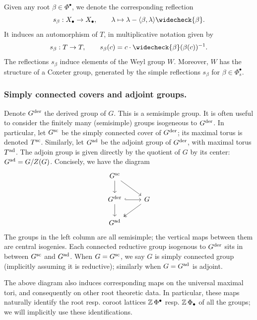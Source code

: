 Given any root $\beta \in \Phi^{\bullet}$, we denote the corresponding reflection
\begin{equation*}
    s_{\beta}: X_{\bullet} \to X_{\bullet}, \qquad \lambda \mapsto \lambda - \langle \beta, \lambda \rangle \widecheck{\beta}.
\end{equation*}
It induces an automorphism  of $T$, in multiplicative notation given by
\begin{equation*}
s_{\beta}: T \to T, \qquad s_{\beta}(c) = c \cdot \widecheck{\beta}(\beta(c))^{-1}.    
\end{equation*} 
The reflections $s_{\beta}$ induce elements of the Weyl group $W$. Moreover, $W$ has the structure of a Coxeter group, generated by the simple reflections $s_{\beta}$ for $\beta \in \Phi^{\bullet}_{s}$. 



\subsubsection{Simply connected covers and adjoint groups.}\label{subsubsection: simply connected covers and adjoint groups}
Denote $G^{\der}$ the derived group of $G$. This is a semisimple group. It is often useful to consider the finitely many (semisimple) groups isogeneous to $G^{\der}$. 
In particular, let $G^{\sc}$ be the simply connected cover of $G^{\der}$; its maximal torus is denoted $T^{\sc}$. Similarly, let $G^{\ad}$ be the adjoint group of $G^{\der}$, with maximal torus $T^{\ad}$. The adjoin group is given directly by the quotient of $G$ by its center: $G^{\ad} = G/Z(G)$. Concisely, we have the diagram
\begin{equation*}
\begin{tikzcd}
G^{\sc} \arrow[d] \arrow[rd]\\
G^{\der} \arrow[r, hook] \arrow[d] & G \arrow[ld, two heads]\\
G^{\ad}
\end{tikzcd}    
\end{equation*}
The groups in the left column are all semisimple; the vertical maps between them are central isogenies. Each connected reductive group isogenous to $G^{\der}$ sits in between $G^{\sc}$ and $G^{\ad}$.
When $G=G^{\sc}$, we say $G$ is simply connected group (implicitly assuming it is reductive); similarly when $G=G^{\ad}$ is adjoint.

The above diagram also induces corresponding maps on the universal maximal tori, and consequently on other root theoretic data. In particular, these maps naturally identify the root resp. coroot lattices $\Z\Phi^{\bullet}$ resp. $\Z\Phi_{\bullet}$ of all the groups; we will implicitly use these identifications. 

